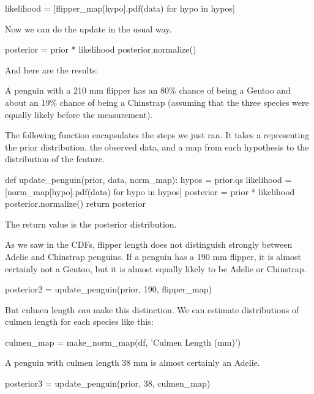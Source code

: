 \documentclass[12pt]{book}
\theoremstyle{exercise}
\begin{document}
\begin{code}
likelihood = [flipper_map[hypo].pdf(data) for hypo in hypos]
\end{code}

Now we can do the update in the usual way.

\begin{code}
posterior = prior * likelihood
posterior.normalize()
\end{code}

And here are the results:



A penguin with a 210 mm flipper has an 80\% chance of being a Gentoo and
about an 19\% chance of being a Chinstrap (assuming that the three
species were equally likely before the measurement).

The following function encapsulates the steps we just ran. It takes a
 representing the prior distribution, the
observed data, and a map from each hypothesis to the distribution of the
feature.

\begin{code}
def update_penguin(prior, data, norm_map):
    hypos = prior.qs
    likelihood = [norm_map[hypo].pdf(data) for hypo in hypos]
    posterior = prior * likelihood
    posterior.normalize()
    return posterior
\end{code}

The return value is the posterior distribution.

As we saw in the CDFs, flipper length does not distinguish strongly
between Adelie and Chinstrap penguins. If a penguin has a 190 mm
flipper, it is almost certainly not a Gentoo, but it is almost equally
likely to be Adelie or Chinstrap.

\begin{code}
posterior2 = update_penguin(prior, 190, flipper_map)
\end{code}

But culmen length \emph{can} make this distinction. We can estimate
distributions of culmen length for each species like this:

\begin{code}
culmen_map = make_norm_map(df, 'Culmen Length (mm)')
\end{code}

A penguin with culmen length 38 mm is almost certainly an Adelie.

\begin{code}
posterior3 = update_penguin(prior, 38, culmen_map)
\end{code}
\end{document}

